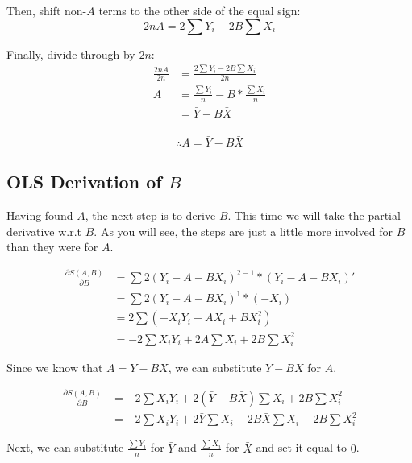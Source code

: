 \documentclass[11pt,openany]{book}\usepackage[]{graphicx}\usepackage[]{color}
\begin{document}
\noindent Then, shift non-$A$ terms to the other side of the equal sign:
\begin{equation*}
2nA = 2 \sum Y_{i}-2B \sum X_{i} 
\end{equation*}

\noindent Finally, divide through by $2n$: 
\begin{align*}
\frac{2nA}{2n} &= \frac{2 \sum Y_{i}-2B \sum X_{i}}{2n} \\
A &= \frac{\sum Y_{i}}{n}-B*\frac{\sum X_{i}}{n} \\
&= \bar {Y}-B \bar{X} \\
\end{align*}

\begin{equation}
\label{eq:A} 
\therefore A = \bar {Y}-B \bar{X} 
\end{equation}


\subsection{OLS Derivation of $B$}

Having found $A$, the next step is to derive $B$. This time we will take the partial derivative w.r.t $B$. As you will see, the steps are just a little more involved for $B$ than they were for $A$.

\begin{align*}
\frac{\partial S(A,B)}{\partial B} &= \sum
2(Y_{i}-A-BX_{i})^{2-1}*(Y_{i}-A-BX_{i})' \\
&= \sum 2(Y_{i}-A-BX_{i})^{1}*(-X_{i}) \\
&= 2 \sum (-X_{i}Y_{i}+AX_{i}+BX^{2}_{i}) \\ 
&= -2 \sum X_{i}Y_{i}+2A \sum X_{i} + 2B \sum X^{2}_{i}  
\end{align*}

\noindent Since we know that $A = \bar {Y}-B \bar{X}$, we can substitute $\bar {Y}-B
\bar{X}$ for $A$. 

\begin{align*}
\frac{\partial S(A,B)}{\partial B} &= -2 \sum X_{i}Y_{i}+2(\bar {Y}-B
\bar{X})\sum X_{i} + 2B \sum X^{2}_{i} \\
&= -2 \sum X_{i}Y_{i}+2 \bar{Y} \sum X_{i}-2B \bar{X} \sum X_{i} + 2B
\sum X^{2}_{i} 
\end{align*}

\noindent Next, we can substitute $\frac{\sum Y_{i}}{n}$ for $\bar{Y}$ and $\frac{\sum X_{i}}{n}$ for $\bar{X}$ and set it equal to $0$. 
\end{document}
